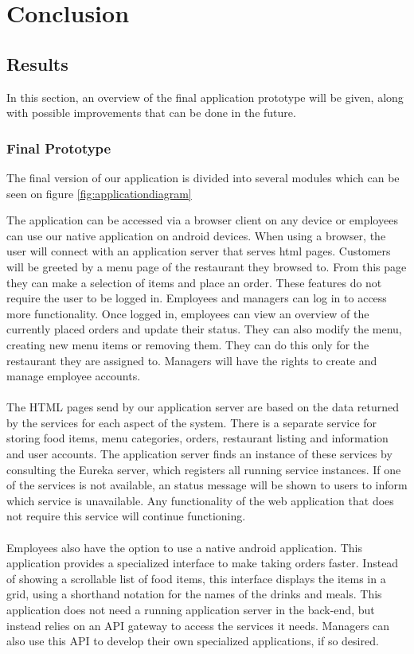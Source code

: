 \documentclass[12pt]{article}
\begin{document}
\section{Conclusion}
\begin{multicols}{2}
\subsection{Results}\label{sec:results}

\noindent In this section, an overview of the final application prototype will be given, along with possible improvements that can be done in the future.
\subsubsection{Final Prototype}
The final version of our application is divided into several modules which can be seen on figure \ref{fig:applicationdiagram}

\noindent The application can be accessed via a browser client on any device or employees can use our native application on android devices. When using a browser, the user will connect with an application server that serves html pages. Customers will be greeted by a menu page of the restaurant they browsed to. From this page they can make a selection of items and place an order. These features do not require the user to be logged in. Employees and managers can log in to access more functionality. Once logged in, employees can view an overview of the currently placed orders and update their status. They can also modify the menu, creating new menu items or removing them. They can do this only for the restaurant they are assigned to. Managers will have the rights to create and manage employee accounts.
\\\\
The HTML pages send by our application server are based on the data returned by the services for each aspect of the system. There is a separate service for storing food items, menu categories, orders, restaurant listing and information and user accounts. The application server finds an instance of these services by consulting the Eureka server, which registers all running service instances. If one of the services is not available, an status message will be shown to users to inform which service is unavailable. Any functionality of the web application that does not require this service will continue functioning.
\\\\ 
Employees also have the option to use a native android application. This application provides a specialized interface to make taking orders faster. Instead of showing a scrollable list of food items, this interface displays the items in a grid, using a shorthand notation for the names of the drinks and meals. This application does not need a running application server in the back-end, but instead relies on an API gateway to access the services it needs. Managers can also use this API to develop their own specialized applications, if so desired.

\end{multicols}
\end{document}
